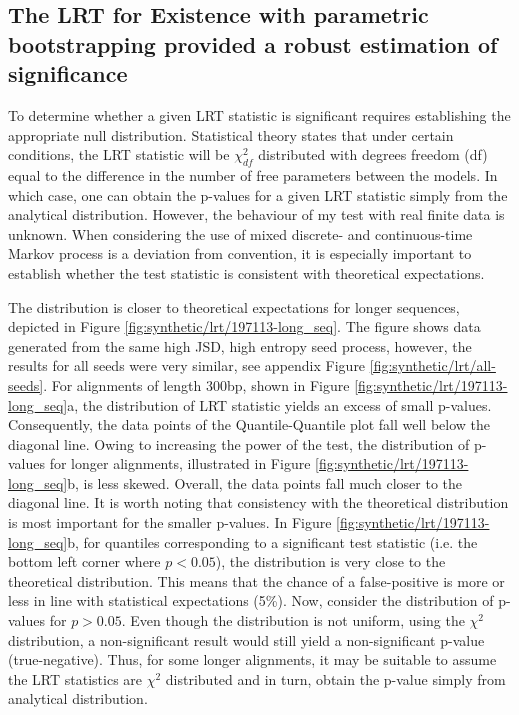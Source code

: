 \subsection*{The LRT for Existence with parametric bootstrapping provided a robust estimation of significance}

To determine whether a given LRT statistic is significant requires establishing the appropriate null distribution. Statistical theory states that under certain conditions, the LRT statistic will be $\chi^2_{df}$ distributed with degrees freedom (df) equal to the difference in the number of free parameters between the models. In which case, one can obtain the p-values for a given LRT statistic simply from the analytical distribution. However, the behaviour of my test with real finite data is unknown. When considering the use of mixed discrete- and continuous-time Markov process is a deviation from convention, it is especially important to establish whether the test statistic is consistent with theoretical expectations. 

The distribution is closer to theoretical expectations for longer sequences, depicted in Figure \ref{fig:synthetic/lrt/197113-long_seq}. The figure shows data generated from the same high JSD, high entropy seed process, however, the results for all seeds were very similar, see appendix Figure \ref{fig:synthetic/lrt/all-seeds}. For alignments of length 300bp, shown in Figure \ref{fig:synthetic/lrt/197113-long_seq}a, the distribution of LRT statistic yields an excess of small p-values. Consequently, the data points of the Quantile-Quantile plot fall well below the diagonal line. Owing to increasing the power of the test, the distribution of p-values for longer alignments, illustrated in Figure \ref{fig:synthetic/lrt/197113-long_seq}b, is less skewed. Overall, the data points fall much closer to the diagonal line. It is worth noting that consistency with the theoretical distribution is most important for the smaller p-values. In Figure \ref{fig:synthetic/lrt/197113-long_seq}b, for quantiles corresponding to a significant test statistic (i.e. the bottom left corner where $p<0.05$), the distribution is very close to the theoretical distribution. This means that the chance of a false-positive is more or less in line with statistical expectations (5\%). Now, consider the distribution of p-values for $p>0.05$. Even though the distribution is not uniform, using the $\chi^{2}$ distribution, a non-significant result would still yield a non-significant p-value (true-negative). Thus, for some longer alignments, it may be suitable to assume the LRT statistics are $\chi^{2}$ distributed and in turn, obtain the p-value simply from analytical distribution. 

